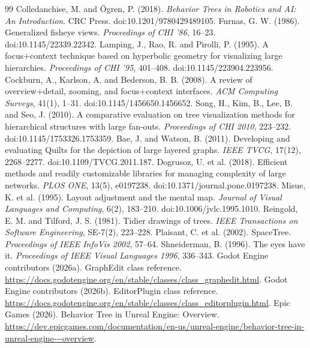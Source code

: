 \begin{thebibliography}{99}
 Colledanchise, M. and Ögren, P. (2018). \emph{Behavior Trees in Robotics and AI: An Introduction}. CRC Press. doi:10.1201/9780429489105.
 Furnas, G. W. (1986). Generalized fisheye views. \emph{Proceedings of CHI '86}, 16--23. doi:10.1145/22339.22342.
 Lamping, J., Rao, R. and Pirolli, P. (1995). A focus+context technique based on hyperbolic geometry for visualizing large hierarchies. \emph{Proceedings of CHI '95}, 401--408. doi:10.1145/223904.223956.
 Cockburn, A., Karlson, A. and Bederson, B. B. (2008). A review of overview+detail, zooming, and focus+context interfaces. \emph{ACM Computing Surveys}, 41(1), 1--31. doi:10.1145/1456650.1456652.
 Song, H., Kim, B., Lee, B. and Seo, J. (2010). A comparative evaluation on tree visualization methods for hierarchical structures with large fan-outs. \emph{Proceedings of CHI 2010}, 223--232. doi:10.1145/1753326.1753359.
 Bae, J. and Watson, B. (2011). Developing and evaluating Quilts for the depiction of large layered graphs. \emph{IEEE TVCG}, 17(12), 2268--2277. doi:10.1109/TVCG.2011.187.
 Dogrusoz, U. et al. (2018). Efficient methods and readily customizable libraries for managing complexity of large networks. \emph{PLOS ONE}, 13(5), e0197238. doi:10.1371/journal.pone.0197238.
 Misue, K. et al. (1995). Layout adjustment and the mental map. \emph{Journal of Visual Languages and Computing}, 6(2), 183--210. doi:10.1006/jvlc.1995.1010.
 Reingold, E. M. and Tilford, J. S. (1981). Tidier drawings of trees. \emph{IEEE Transactions on Software Engineering}, SE-7(2), 223--228.
 Plaisant, C. et al. (2002). SpaceTree. \emph{Proceedings of IEEE InfoVis 2002}, 57--64.
 Shneiderman, B. (1996). The eyes have it. \emph{Proceedings of IEEE Visual Languages 1996}, 336--343.
 Godot Engine contributors (2026a). GraphEdit class reference. \url{https://docs.godotengine.org/en/stable/classes/class_graphedit.html}.
 Godot Engine contributors (2026b). EditorPlugin class reference. \url{https://docs.godotengine.org/en/stable/classes/class_editorplugin.html}.
 Epic Games (2026). Behavior Tree in Unreal Engine: Overview. \url{https://dev.epicgames.com/documentation/en-us/unreal-engine/behavior-tree-in-unreal-engine---overview}.
\end{thebibliography}
